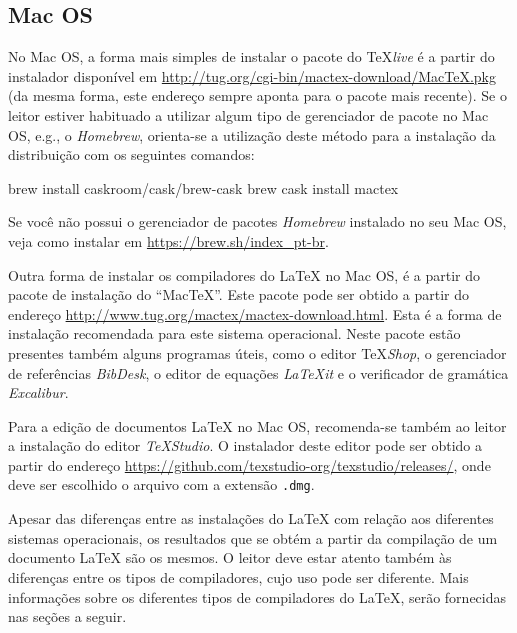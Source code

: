 \subsection*{Mac OS}
\label{sec:macos}

No Mac OS, a forma mais simples de instalar o pacote do \TeX \textit{live} é a partir do instalador disponível em \url{http://tug.org/cgi-bin/mactex-download/MacTeX.pkg} (da mesma forma, este endereço sempre aponta para o pacote mais recente). Se o leitor estiver habituado a utilizar algum tipo de gerenciador de pacote no Mac OS, e.g., o \textit{Homebrew}, orienta-se a utilização deste método para a instalação da distribuição com os seguintes comandos:

\begin{meucomando}
brew install caskroom/cask/brew-cask
brew cask install mactex
\end{meucomando}

\begin{marker}
Se você não possui o gerenciador de pacotes \textit{Homebrew} instalado no seu Mac OS, veja como instalar em \url{https://brew.sh/index_pt-br}.
\end{marker}

Outra forma de instalar os compiladores do \LaTeX{} no Mac OS, é a partir do pacote de instalação do ``MacTeX''. Este pacote pode ser obtido a partir do endereço \url{http://www.tug.org/mactex/mactex-download.html}. Esta é a forma de instalação recomendada para este sistema operacional. Neste pacote estão presentes também alguns programas úteis, como o editor \TeX \textit{Shop}, o gerenciador de referências \textit{BibDesk}, o editor de equações \textit{LaTeXit} e o verificador de gramática \textit{Excalibur}.

Para a edição de documentos \LaTeX{} no Mac OS, recomenda-se também ao leitor a instalação do editor \textit{TeXStudio}. O instalador deste editor pode ser obtido a partir do endereço \url{https://github.com/texstudio-org/texstudio/releases/}, onde deve ser escolhido o arquivo com a extensão {\tt .dmg}.

Apesar das diferenças entre as instalações do \LaTeX{} com relação aos diferentes sistemas operacionais, os resultados que se obtém a partir da compilação de um documento \LaTeX{} são os mesmos. O leitor deve estar atento também às diferenças entre os tipos de compiladores, cujo uso pode ser diferente. Mais informações sobre os diferentes tipos de compiladores do \LaTeX{}, serão fornecidas nas seções a seguir.